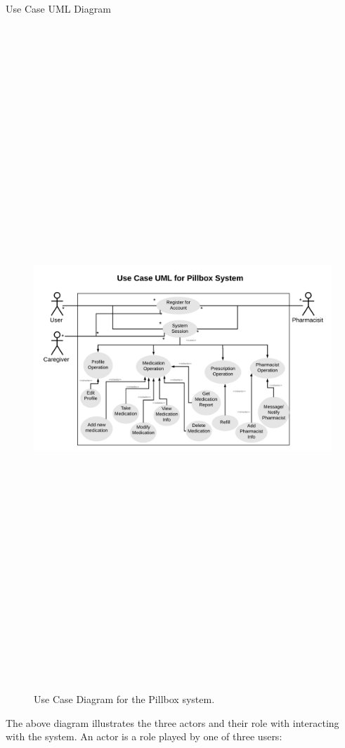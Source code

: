 \documentclass[22pt]{beamer}
\begin{document}
\begin{frame}[fragile]
\begin{textblock}{7.25}
\begin{block}{Use Case UML Diagram}
\begin{figure}
\begin{center}
\includegraphics[height=25cm, width=40cm]{UseCaseUML.png}
\end{center}
\caption{Use Case Diagram for the Pillbox system. }
\end{figure}
The above diagram illustrates the three actors and their role with interacting with the system. An actor is a role played by one of three users:

\end{block}
\end{textblock}
\end{frame}
\end{document}
